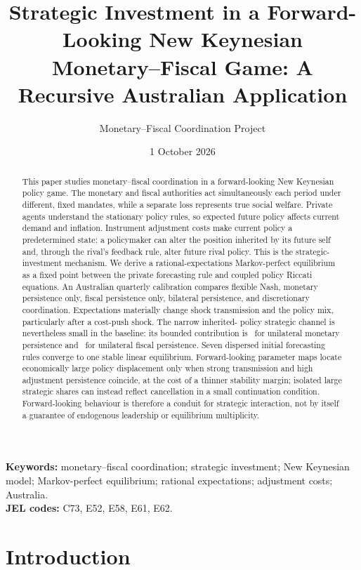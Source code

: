 \documentclass[11pt]{article}
\title{Strategic Investment in a Forward-Looking New Keynesian\\
Monetary--Fiscal Game: A Recursive Australian Application}
\author{Monetary--Fiscal Coordination Project}
\date{1 October 2026}
\begin{document}
\maketitle

\begin{abstract}
This paper studies monetary--fiscal coordination in a forward-looking New
Keynesian policy game. The monetary and fiscal authorities act simultaneously
each period under different, fixed mandates, while a separate loss represents
true social welfare. Private agents understand the stationary policy rules, so
expected future policy affects current demand and inflation. Instrument
adjustment costs make current policy a predetermined state: a policymaker can
alter the position inherited by its future self and, through the rival's
feedback rule, alter future rival policy. This is the strategic-investment
mechanism. We derive a rational-expectations Markov-perfect equilibrium as a
fixed point between the private forecasting rule and coupled policy Riccati
equations. An Australian quarterly calibration compares flexible Nash,
monetary persistence only, fiscal persistence only, bilateral persistence, and
discretionary coordination. Expectations materially change shock transmission
and the policy mix, particularly after a cost-push shock. The narrow inherited-
policy strategic channel is nevertheless small in the baseline: its bounded
contribution is \NKMonInvestmentShare\ for unilateral monetary persistence and
\NKFisInvestmentShare\ for unilateral fiscal persistence. Seven dispersed
initial forecasting rules converge to one stable linear equilibrium.
Forward-looking parameter maps locate economically large policy displacement
only when strong transmission and high adjustment persistence coincide, at the
cost of a thinner stability margin; isolated large strategic shares can instead
reflect cancellation in a small continuation condition. Forward-looking
behaviour is therefore a conduit for strategic interaction, not by itself a
guarantee of endogenous leadership or equilibrium multiplicity.
\end{abstract}

\noindent\textbf{Keywords:} monetary--fiscal coordination; strategic
investment; New Keynesian model; Markov-perfect equilibrium; rational
expectations; adjustment costs; Australia.\\
\textbf{JEL codes:} C73, E52, E58, E61, E62.

\section{Introduction}
\end{document}

